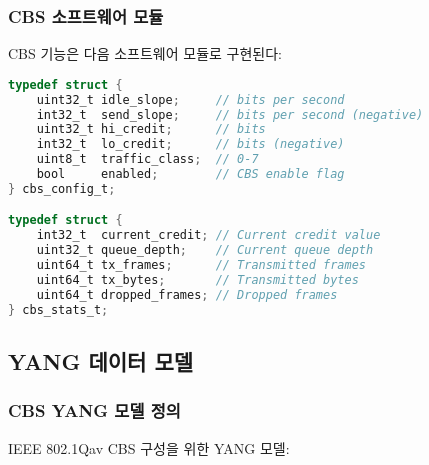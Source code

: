\documentclass[twocolumn,10pt]{article}
\begin{document}
\subsubsection{CBS 소프트웨어 모듈}

CBS 기능은 다음 소프트웨어 모듈로 구현된다:

\begin{lstlisting}[language=C, caption=CBS 구성 구조체]
typedef struct {
    uint32_t idle_slope;     // bits per second
    int32_t  send_slope;     // bits per second (negative)
    uint32_t hi_credit;      // bits
    int32_t  lo_credit;      // bits (negative)
    uint8_t  traffic_class;  // 0-7
    bool     enabled;        // CBS enable flag
} cbs_config_t;

typedef struct {
    int32_t  current_credit; // Current credit value
    uint32_t queue_depth;    // Current queue depth
    uint64_t tx_frames;      // Transmitted frames
    uint64_t tx_bytes;       // Transmitted bytes
    uint64_t dropped_frames; // Dropped frames
} cbs_stats_t;
\end{lstlisting}

\subsection{YANG 데이터 모델}

\subsubsection{CBS YANG 모델 정의}

IEEE 802.1Qav CBS 구성을 위한 YANG 모델:
\end{document}
